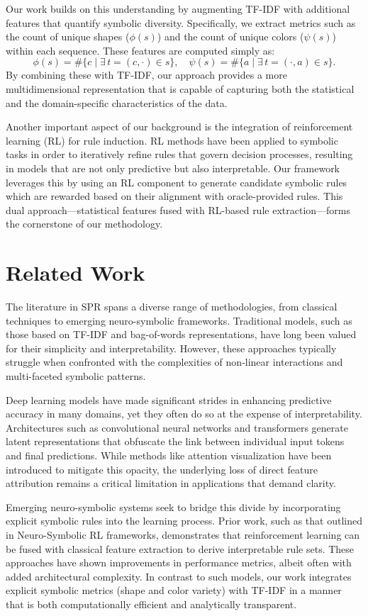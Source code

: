 \documentclass{article}
\begin{document}
Our work builds on this understanding by augmenting TF-IDF with additional features that quantify symbolic diversity. Specifically, we extract metrics such as the count of unique shapes (\(\phi(s)\)) and the count of unique colors (\(\psi(s)\)) within each sequence. These features are computed simply as:
\[
\phi(s) = \#\{ c \mid \exists\, t=(c,\cdot) \in s \}, \quad \psi(s) = \#\{ a \mid \exists\, t=(\cdot,a) \in s \}.
\]
By combining these with TF-IDF, our approach provides a more multidimensional representation that is capable of capturing both the statistical and the domain-specific characteristics of the data.

Another important aspect of our background is the integration of reinforcement learning (RL) for rule induction. RL methods have been applied to symbolic tasks in order to iteratively refine rules that govern decision processes, resulting in models that are not only predictive but also interpretable. Our framework leverages this by using an RL component to generate candidate symbolic rules which are rewarded based on their alignment with oracle-provided rules. This dual approach—statistical features fused with RL-based rule extraction—forms the cornerstone of our methodology.

\section{Related Work}
The literature in SPR spans a diverse range of methodologies, from classical techniques to emerging neuro-symbolic frameworks. Traditional models, such as those based on TF-IDF and bag-of-words representations, have long been valued for their simplicity and interpretability. However, these approaches typically struggle when confronted with the complexities of non-linear interactions and multi-faceted symbolic patterns.

Deep learning models have made significant strides in enhancing predictive accuracy in many domains, yet they often do so at the expense of interpretability. Architectures such as convolutional neural networks and transformers generate latent representations that obfuscate the link between individual input tokens and final predictions. While methods like attention visualization have been introduced to mitigate this opacity, the underlying loss of direct feature attribution remains a critical limitation in applications that demand clarity.

Emerging neuro-symbolic systems seek to bridge this divide by incorporating explicit symbolic rules into the learning process. Prior work, such as that outlined in Neuro-Symbolic RL frameworks, demonstrates that reinforcement learning can be fused with classical feature extraction to derive interpretable rule sets. These approaches have shown improvements in performance metrics, albeit often with added architectural complexity. In contrast to such models, our work integrates explicit symbolic metrics (shape and color variety) with TF-IDF in a manner that is both computationally efficient and analytically transparent.
\end{document}
